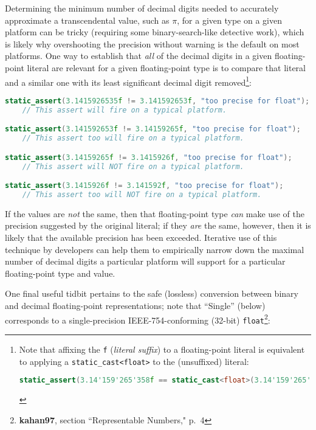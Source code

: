 Determining the minimum number of decimal digits needed to accurately
approximate a transcendental value, such as $\pi$, for a given type on
a given platform can be tricky (requiring some binary-search-like
detective work), which is likely why overshooting the precision without
warning is the default on most platforms. One way to establish that
\emph{all} of the decimal digits in a given floating-point literal are
relevant for a given floating-point type is to compare that literal and
a similar one with its least significant decimal digit
removed{\cprotect\footnote{Note that affixing the \texttt{f}
(\emph{literal suffix}) to a floating-point literal is
equivalent to applying a \texttt{static\_cast<float>} to the
(unsuffixed) literal:

\begin{lstlisting}[language=C++, basicstyle={\ttfamily\footnotesize}]
static_assert(3.14'159'265'358f == static_cast<float>(3.14'159'265'358));
\end{lstlisting}\vspace*{-1ex}
      }}:

\begin{lstlisting}[language=C++]
static_assert(3.1415926535f != 3.141592653f, "too precise for float");
    // This assert will fire on a typical platform.

static_assert(3.141592653f != 3.14159265f, "too precise for float");
    // This assert too will fire on a typical platform.

static_assert(3.14159265f != 3.1415926f, "too precise for float");
    // This assert will NOT fire on a typical platform.

static_assert(3.1415926f != 3.141592f, "too precise for float");
    // This assert too will NOT fire on a typical platform.
\end{lstlisting}

\noindent If the values are \emph{not} the same, then that floating-point type
\emph{can} make use of the precision suggested by the original literal; if
they \emph{are} the same, however, then it is likely that the available
precision has been exceeded. Iterative use of this technique by
developers can help them to empirically narrow down the maximal number
of decimal digits a particular platform will support for a particular
floating-point type and value.

One final useful tidbit pertains to the safe (lossless) conversion
between binary and decimal floating-point representations; note that
``Single'' (below) corresponds to a single-precision IEEE-754-conforming
(32-bit) \texttt{float}{\cprotect\footnote{\textbf{kahan97}, section ``Representable Numbers," p.~4}}:

